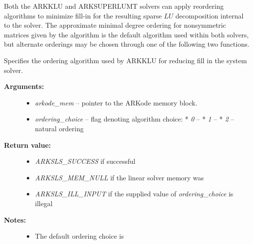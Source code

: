 \documentclass[letterpaper,10pt,english]{sphinxmanual}
\begin{document}
Both the ARKKLU and ARKSUPERLUMT solvers can apply reordering
algorithms to minimize fill-in for the resulting sparse $LU$
decomposition internal to the solver.  The approximate minimal degree
ordering for nonsymmetric matrices given by the  algorithm
is the default algorithm used within both solvers, but alternate
orderings may be chosen through one of the following two functions.

\begin{fulllineitems}
\label{c_interface/User_callable:ARKKLUSetOrdering}
Specifies the ordering algorithm used by ARKKLU for reducing fill
in the system solver.
\begin{description}
\item[{\textbf{Arguments:}}] \leavevmode\begin{itemize}
\item {} 
\emph{arkode\_mem} -- pointer to the ARKode memory block.

\item {} 
\emph{ordering\_choice} -- flag denoting algorithm choice:
* \emph{0} -- 
* \emph{1} -- 
* \emph{2} -- natural ordering

\end{itemize}

\item[{\textbf{Return value:}}] \leavevmode\begin{itemize}
\item {} 
\emph{ARKSLS\_SUCCESS}  if successful

\item {} 
\emph{ARKSLS\_MEM\_NULL} if the linear solver memory was 

\item {} 
\emph{ARKSLS\_ILL\_INPUT} if the supplied value of \emph{ordering\_choice} is illegal

\end{itemize}

\item[{\textbf{Notes:}}] \leavevmode\begin{itemize}
\item {} 
The default ordering choice is 

\end{itemize}

\end{description}

\end{fulllineitems}
\end{document}
